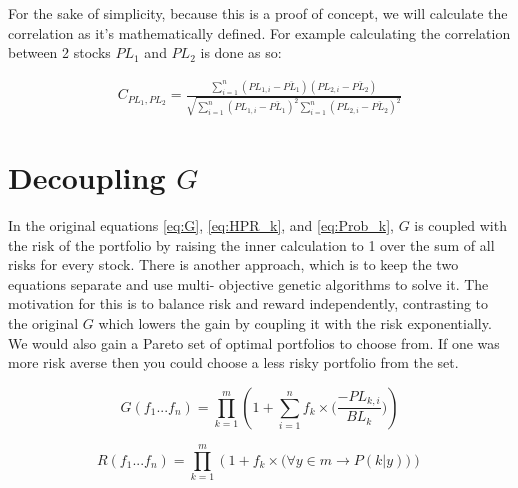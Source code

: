 \documentclass[11pt]{article}
\begin{document}
    For the sake of simplicity, because this is a proof of concept, we will calculate the
    correlation as it's mathematically defined.
    For example calculating the correlation between 2 stocks \(PL_1\) and \(PL_2\) is
    done as so:

    \begin{align}
        C_{PL_1, PL_2} = 
        \frac{
            \displaystyle\sum^{n}_{i=1} (PL_{1, i} - \overline {PL_1})(PL_{2, i} - \overline {PL_2})
        }{
            \sqrt{
                \displaystyle\sum^{n}_{i=1}(PL_{1,i} - \overline {PL_1})^2 
                \displaystyle\sum^{n}_{i=1}(PL_{2,i} - \overline {PL_2})^2
            }
        }
        \label{eq:Correlation}
    \end{align}

\section{Decoupling \(G\)} \label{section:DecoupleG}

    In the original equations \ref{eq:G}, \ref{eq:HPR_k}, and \ref{eq:Prob_k},
    \(G\) is coupled with the risk of the portfolio
    by raising the inner calculation to 1 over the sum of all risks for every stock.
    There is another approach, which is to keep the two equations separate and use multi-
    objective genetic algorithms to solve it. The motivation for this is to balance risk
    and reward independently, contrasting to the original \(G\) which lowers the gain
    by coupling it with the risk exponentially. We would also gain a Pareto set of
    optimal portfolios to choose from. If one was more risk averse then you could choose
    a less risky portfolio from the set.

    \begin{equation}\label{eq:DecoupleG}
        G(f_1...f_n) = \displaystyle\prod^{m}_{k=1} \left(
                1 + \displaystyle\sum^{n}_{i=1} f_k \times \Big(
                    \frac{- PL_{k,i} }{BL_k}
                \Big)
            \right)
    \end{equation}

    \begin{equation}\label{eq:DecoupleR}
        R(f_1...f_n) = \displaystyle\prod^{m}_{k=1} \left(
                1 + f_k \times \Big(
                    \forall y \in m \to P(k|y)
                \Big)
            \right)
    \end{equation}
\end{document}
